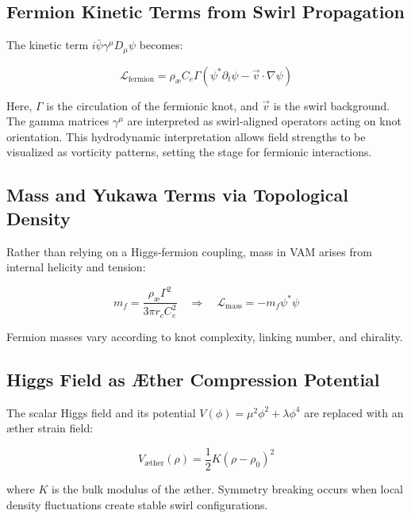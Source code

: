 \subsection{Fermion Kinetic Terms from Swirl Propagation}

The kinetic term $i\bar{\psi}\gamma^\mu D_\mu \psi$ becomes:

\begin{equation}
\mathcal{L}_{\text{fermion}} = \rho_{\text{\ae}} C_e \Gamma \left( \psi^* \partial_t \psi - \vec{v} \cdot \nabla \psi \right)
\end{equation}

Here, $\Gamma$ is the circulation of the fermionic knot, and $\vec{v}$ is the swirl background. The gamma matrices $\gamma^\mu$ are interpreted as swirl-aligned operators acting on knot orientation. This hydrodynamic interpretation allows field strengths to be visualized as vorticity patterns, setting the stage for fermionic interactions.

\subsection{Mass and Yukawa Terms via Topological Density}

Rather than relying on a Higgs-fermion coupling, mass in VAM arises from internal helicity and tension:

\begin{equation}
m_f = \frac{\rho_{\text{\ae}} \Gamma^2}{3\pi r_c C_e^2}
\quad \Rightarrow \quad
\mathcal{L}_{\text{mass}} = -m_f \psi^* \psi
\end{equation}

Fermion masses vary according to knot complexity, linking number, and chirality.

\subsection{Higgs Field as Æther Compression Potential}

The scalar Higgs field and its potential $V(\phi) = \mu^2 \phi^2 + \lambda \phi^4$ are replaced with an æther strain field:

\begin{equation}
V_{\text{æther}}(\rho) = \frac{1}{2}K(\rho - \rho_0)^2
\end{equation}

where $K$ is the bulk modulus of the æther. Symmetry breaking occurs when local density fluctuations create stable swirl configurations.

